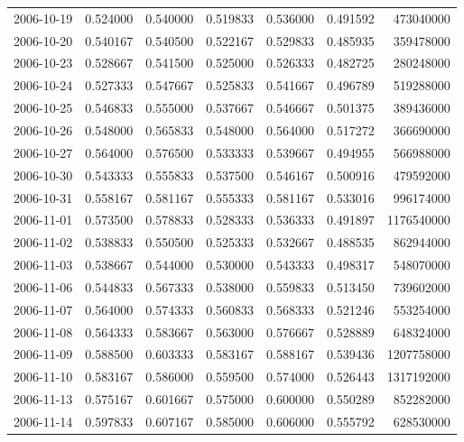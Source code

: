 \begin{tabular}{lrrrrrr}
2006-10-19 &    0.524000 &    0.540000 &    0.519833 &    0.536000 &    0.491592 &   473040000 \\
2006-10-20 &    0.540167 &    0.540500 &    0.522167 &    0.529833 &    0.485935 &   359478000 \\
2006-10-23 &    0.528667 &    0.541500 &    0.525000 &    0.526333 &    0.482725 &   280248000 \\
2006-10-24 &    0.527333 &    0.547667 &    0.525833 &    0.541667 &    0.496789 &   519288000 \\
2006-10-25 &    0.546833 &    0.555000 &    0.537667 &    0.546667 &    0.501375 &   389436000 \\
2006-10-26 &    0.548000 &    0.565833 &    0.548000 &    0.564000 &    0.517272 &   366690000 \\
2006-10-27 &    0.564000 &    0.576500 &    0.533333 &    0.539667 &    0.494955 &   566988000 \\
2006-10-30 &    0.543333 &    0.555833 &    0.537500 &    0.546167 &    0.500916 &   479592000 \\
2006-10-31 &    0.558167 &    0.581167 &    0.555333 &    0.581167 &    0.533016 &   996174000 \\
2006-11-01 &    0.573500 &    0.578833 &    0.528333 &    0.536333 &    0.491897 &  1176540000 \\
2006-11-02 &    0.538833 &    0.550500 &    0.525333 &    0.532667 &    0.488535 &   862944000 \\
2006-11-03 &    0.538667 &    0.544000 &    0.530000 &    0.543333 &    0.498317 &   548070000 \\
2006-11-06 &    0.544833 &    0.567333 &    0.538000 &    0.559833 &    0.513450 &   739602000 \\
2006-11-07 &    0.564000 &    0.574333 &    0.560833 &    0.568333 &    0.521246 &   553254000 \\
2006-11-08 &    0.564333 &    0.583667 &    0.563000 &    0.576667 &    0.528889 &   648324000 \\
2006-11-09 &    0.588500 &    0.603333 &    0.583167 &    0.588167 &    0.539436 &  1207758000 \\
2006-11-10 &    0.583167 &    0.586000 &    0.559500 &    0.574000 &    0.526443 &  1317192000 \\
2006-11-13 &    0.575167 &    0.601667 &    0.575000 &    0.600000 &    0.550289 &   852282000 \\
2006-11-14 &    0.597833 &    0.607167 &    0.585000 &    0.606000 &    0.555792 &   628530000 \\

\end{tabular}
